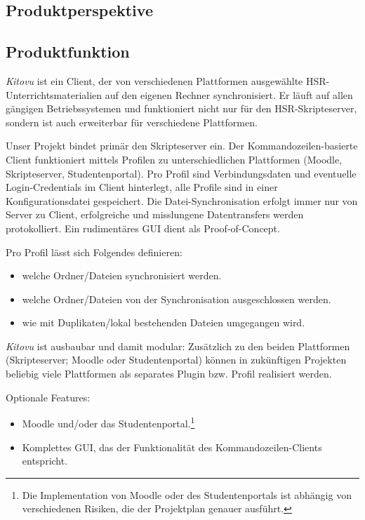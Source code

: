 \documentclass[a4paper]{article}
\begin{document}
\subsection{Produktperspektive}

\subsection{Produktfunktion}
\emph{Kitovu} ist ein Client, der von verschiedenen Plattformen ausgewählte HSR-Unterrichtsmaterialien auf den eigenen Rechner synchronisiert. Er läuft auf allen gängigen Betriebssystemen und funktioniert nicht nur für den HSR-Skripteserver, sondern ist auch erweiterbar für verschiedene Plattformen.

Unser Projekt bindet primär den Skripteserver ein. Der Kommandozeilen-basierte Client funktioniert mittels Profilen zu unterschiedlichen Plattformen (Moodle, Skripteserver, Studentenportal). Pro Profil sind Verbindungsdaten und eventuelle Login-Credentials im Client hinterlegt, alle Profile sind in einer Konfigurationsdatei gespeichert. Die Datei-Synchronisation erfolgt immer nur von Server zu Client, erfolgreiche und misslungene Datentransfers werden protokolliert. Ein rudimentäres GUI dient als Proof-of-Concept.

Pro Profil lässt sich Folgendes definieren:

\begin{itemize}
	\item welche Ordner/Dateien synchronisiert werden.
	\item welche Ordner/Dateien von der Synchronisation ausgeschlossen werden.
	\item wie mit Duplikaten/lokal bestehenden Dateien umgegangen wird.
\end{itemize}

\emph{Kitovu} ist ausbaubar und damit modular: Zusätzlich zu den beiden Plattformen (Skripteserver; Moodle oder Studentenportal) können in zukünftigen Projekten beliebig viele Plattformen als separates Plugin bzw. Profil realisiert werden.

Optionale Features:

\begin{itemize}
	\item Moodle und/oder das Studentenportal.\footnote{Die Implementation von Moodle oder des Studentenportals ist abhängig von verschiedenen Risiken, die der Projektplan genauer ausführt.} 
	\item Komplettes GUI, das der Funktionalität des Kommandozeilen-Clients entspricht.
\end{itemize}
\end{document}
